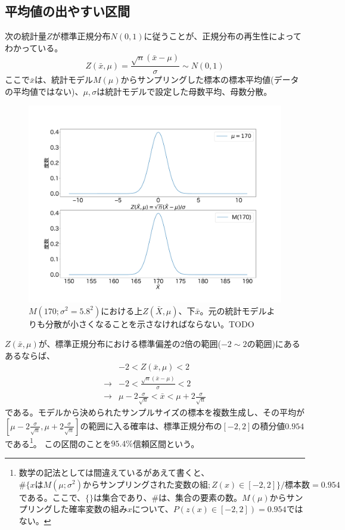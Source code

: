 \subsection{平均値の出やすい区間}
次の統計量$Z$が標準正規分布$N(0,1)$に従うことが、正規分布の再生性によってわかっている。
$$
Z(\bar{x},\mu)=\frac{\sqrt{n}(\bar{x}-\mu)}{\sigma} \sim N(0,1)
$$
ここで$\bar{x}$は、統計モデル$M(\mu)$からサンプリングした標本の標本平均値(データの平均値ではない)、$\mu,\sigma$は統計モデルで設定した母数平均、母数分散。

\begin{figure}
    \begin{center}
        \includegraphics[width=15cm]{./image/03_/normal_Z_frequency.pdf}
        \caption{$M(170;\sigma^2=5.8^2)$における上$Z(\bar{X},\mu)$、下$\bar{x}$。元の統計モデルよりも分散が小さくなることを示さなければならない。TODO}
        \label{fig:cm_standard_normal_distribution}
    \end{center}
\end{figure}
\fi


$Z(\bar{x},\mu)$が、標準正規分布における標準偏差の2倍の範囲($-2 \sim 2$の範囲)にあるあるならば、
\begin{eqnarray*}
    & -2 < Z(\bar{x},\mu)<2 \\
\rightarrow & -2 < \frac{\sqrt{n}(\bar{x}-\mu)}{\sigma}  <2 \\
\rightarrow & \mu - 2 \frac{\sigma}{\sqrt{n}} < \bar{x} < \mu + 2\frac{\sigma}{\sqrt{n}}
\end{eqnarray*}
である。モデルから決められたサンプルサイズの標本を複数生成し、その平均が$[\mu - 2 \frac{\sigma}{\sqrt{n}} ,\mu + 2\frac{\sigma}{\sqrt{n}}]$の範囲に入る確率は、標準正規分布の$[-2,2]$の積分値$0.954$である\footnote{数学の記法としては間違えているがあえて書くと、$\#\{xはM(\mu;\sigma^2)からサンプリングされた変数の組; Z(x)\in[-2,2]\}/標本数=0.954$である。ここで、$\{\}$は集合であり、$\#{}$は、集合の要素の数。$M(\mu)$からサンプリングした確率変数の組み$x$について、$P(z(x)\in[-2,2])=0.954$ではない。}。
この区間のことを$95.4\%$信頼区間という。

